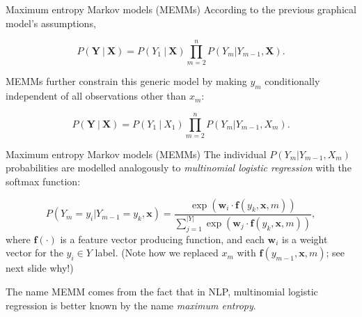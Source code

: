 \documentclass[style=upen, size=14pt]{powerdot}
\theoremstyle{definition}
\begin{document}
  \begin{slide}[toc=MEMMs]{Maximum entropy Markov models (MEMMs)}
    According to the previous graphical model's assumptions,
    \begin{small}
      $$
      P(\mathbf{Y}~|~\mathbf{X}) = P(Y_1~|~ \mathbf{X})\prod_{m=2}^n P(Y_m|Y_{m-1}, \mathbf{X}).
      $$
    \end{small}%
    MEMMs further constrain this generic model by making $y_m$ conditionally
    independent of all observations other than $x_m$:
    \begin{small}
      $$
      P(\mathbf{Y}~|~\mathbf{X}) = P(Y_1~|~X_1)\prod_{m=2}^n P(Y_m|Y_{m-1},X_m).
      $$
  \end{small}
  \end{slide}

  \begin{slide}[toc=MEMMs]{Maximum entropy Markov models (MEMMs)}
    The individual $P(Y_m|Y_{m-1},X_m)$ probabilities are modelled
    analogously to \emph{multinomial logistic regression} with the
    softmax function:
    \begin{small}
      $$
      P(Y_m = y_i|Y_{m-1}=y_k,\mathbf{x})=\frac{\exp (\mathbf{w}_i \cdot \mathbf{f}(y_k,
        \mathbf{x}, m))}{\sum_{j=1}^{|Y|}\exp (\mathbf{w}_j \cdot \mathbf{f}(y_k,
        \mathbf{x}, m))},
      $$
      where $\mathbf{f}(\cdot)$ is a feature vector producing function, and each
      $\mathbf{w}_i$ is a weight vector for the $y_i\in Y$ label. (Note how
      we replaced $x_m$ with $\mathbf{f}(y_{m-1}, \mathbf{x}, m)$; see next
      slide why!)\bigskip
    \end{small}

    The name MEMM comes from the fact that in NLP, multinomial logistic
    regression is better known by the name \emph{maximum entropy}.
  \end{slide}
\end{document}

